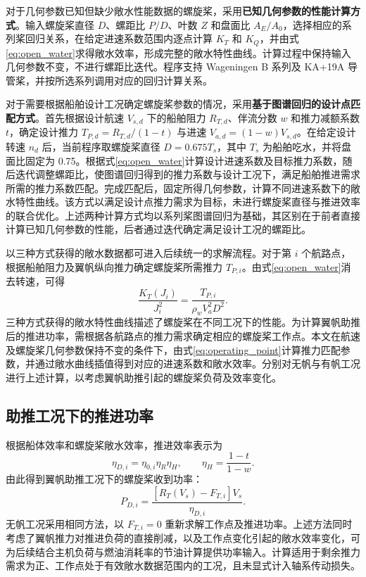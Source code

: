 \documentclass[UTF8,a4paper,twoside,zihao=5,fontset=windows]{ctexart}
\begin{document}
对于几何参数已知但缺少敞水性能数据的螺旋桨，采用\textbf{已知几何参数的性能计算方式}。输入螺旋桨直径 $D$、螺距比 $P/D$、叶数 $Z$ 和盘面比 $A_E/A_0$，选择相应的系列桨回归关系，在给定进速系数范围内逐点计算 $K_T$ 和 $K_Q$，并由式\eqref{eq:open_water}求得敞水效率，形成完整的敞水特性曲线。计算过程中保持输入几何参数不变，不进行螺距比迭代。程序支持 Wageningen B 系列及 KA+19A 导管桨，并按所选系列调用对应的回归计算关系。

对于需要根据船舶设计工况确定螺旋桨参数的情况，采用\textbf{基于图谱回归的设计点匹配方式}。首先根据设计航速 $V_{s,d}$ 下的船舶阻力 $R_{T,d}$、伴流分数 $w$ 和推力减额系数 $t$，确定设计推力 $T_{P,d}=R_{T,d}/(1-t)$ 与进速 $V_{a,d}=(1-w)V_{s,d}$。在给定设计转速 $n_d$ 后，当前程序取螺旋桨直径 $D=0.675T_s$，其中 $T_s$ 为船舶吃水，并将盘面比固定为 0.75。根据式\eqref{eq:open_water}计算设计进速系数及目标推力系数，随后迭代调整螺距比，使图谱回归得到的推力系数与设计工况下，满足船舶推进需求所需的推力系数匹配。完成匹配后，固定所得几何参数，计算不同进速系数下的敞水特性曲线。该方式以满足设计点推力需求为目标，未进行螺旋桨直径与推进效率的联合优化。上述两种计算方式均以系列桨图谱回归为基础，其区别在于前者直接计算已知几何参数的性能，后者通过迭代确定满足设计工况的螺距比。

以三种方式获得的敞水数据都可进入后续统一的求解流程。对于第 $i$ 个航路点，根据船舶阻力及翼帆纵向推力确定螺旋桨所需推力 $T_{P,i}$。由式\eqref{eq:open_water}消去转速，可得
\begin{equation}
\frac{K_T(J_i)}{J_i^2}=\frac{T_{P,i}}{\rho_w V_a^2D^2}.
\label{eq:operating_point}
\end{equation}
三种方式获得的敞水特性曲线描述了螺旋桨在不同工况下的性能。为计算翼帆助推后的推进功率，需根据各航路点的推力需求确定相应的螺旋桨工作点。本文在航速及螺旋桨几何参数保持不变的条件下，由式\eqref{eq:operating_point}计算推力匹配参数，并通过敞水曲线插值得到对应的进速系数和敞水效率。分别对无帆与有帆工况进行上述计算，以考虑翼帆助推引起的螺旋桨负荷及效率变化。

\subsection{助推工况下的推进功率}

根据船体效率和螺旋桨敞水效率，推进效率表示为
\begin{equation}
\eta_{D,i}=\eta_{0,i}\eta_R\eta_H,\qquad \eta_H=\frac{1-t}{1-w}.
\label{eq:efficiency}
\end{equation}
由此得到翼帆助推工况下的螺旋桨收到功率：
\begin{equation}
P_{D,i}=\frac{\left[R_T(V_s)-F_{T,i}\right]V_s}{\eta_{D,i}}.
\label{eq:power}
\end{equation}
无帆工况采用相同方法，以 $F_{T,i}=0$ 重新求解工作点及推进功率。上述方法同时考虑了翼帆推力对推进负荷的直接削减，以及工作点变化引起的敞水效率变化，可为后续结合主机负荷与燃油消耗率的节油计算提供功率输入。计算适用于剩余推力需求为正、工作点处于有效敞水数据范围内的工况，且未显式计入轴系传动损失。
\end{document}
